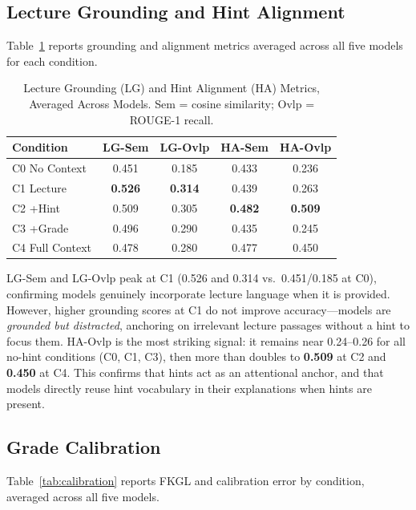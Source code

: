 \documentclass[journal]{IEEEtran}
\begin{document}
\subsection{Lecture Grounding and Hint Alignment}

Table~\ref{tab:grounding} reports grounding and alignment metrics averaged
across all five models for each condition.

\begin{table}[h]
\centering
\caption{Lecture Grounding (LG) and Hint Alignment (HA) Metrics, Averaged
         Across Models. Sem = cosine similarity; Ovlp = ROUGE-1 recall.}
\label{tab:grounding}
\renewcommand{\arraystretch}{1.3}
\begin{tabular}{lcccc}
\toprule
\textbf{Condition} & \textbf{LG-Sem} & \textbf{LG-Ovlp} & \textbf{HA-Sem} & \textbf{HA-Ovlp} \\
\midrule
\rowcolor{lightpurple}
C0 No Context   & 0.451 & 0.185 & 0.433 & 0.236 \\
C1 Lecture      & \textbf{0.526} & \textbf{0.314} & 0.439 & 0.263 \\
\rowcolor{lightpurple}
C2 +Hint        & 0.509 & 0.305 & \textbf{0.482} & \textbf{0.509} \\
C3 +Grade       & 0.496 & 0.290 & 0.435 & 0.245 \\
\rowcolor{lightpurple}
C4 Full Context & 0.478 & 0.280 & 0.477 & 0.450 \\
\bottomrule
\end{tabular}
\end{table}

LG-Sem and LG-Ovlp peak at C1 (0.526 and 0.314 vs.\ 0.451/0.185 at C0),
confirming models genuinely incorporate lecture language when it is provided.
However, higher grounding scores at C1 do not improve accuracy---models are
\emph{grounded but distracted}, anchoring on irrelevant lecture passages without
a hint to focus them. HA-Ovlp is the most striking signal: it remains near
0.24--0.26 for all no-hint conditions (C0, C1, C3), then more than doubles to
\textbf{0.509} at C2 and \textbf{0.450} at C4. This confirms that hints act as
an attentional anchor, and that models directly reuse hint vocabulary in their
explanations when hints are present.

\subsection{Grade Calibration}
\label{sec:calib}

Table~\ref{tab:calibration} reports FKGL and calibration error by condition,
averaged across all five models.
\end{document}

